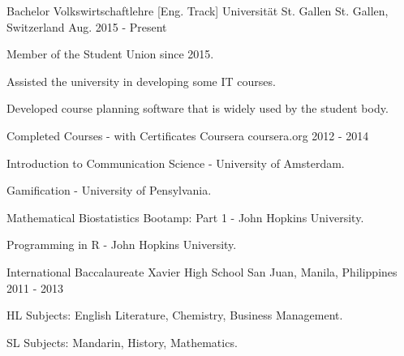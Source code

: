 \begin{cventries}

  \cventry
    {Bachelor Volkswirtschaftlehre [Eng. Track]} %
    {Universität St. Gallen} %
    {St. Gallen, Switzerland} %
    {Aug. 2015 - Present} %
    {} %
    {
      \begin{cvitems} %
        \item {Member of the Student Union since 2015.}
        \item {Assisted the university in developing some IT courses.}
        \item {Developed course planning software that is widely used by the student body.}
      \end{cvitems}
    }

  \cventry
  {Completed Courses - with Certificates} %
  {Coursera} %
  {coursera.org} %
  {2012 - 2014} %
  {} %
  {
    \begin{cvitems} %
        \item {Introduction to Communication Science - University of Amsterdam.}
        \item {Gamification - University of Pensylvania.}
        \item {Mathematical Biostatistics Bootamp: Part 1 - John Hopkins University.}
        \item {Programming in R - John Hopkins University.}
    \end{cvitems}
  }

  \cventry
    {International Baccalaureate} %
    {Xavier High School} %
    {San Juan, Manila, Philippines} %
    {2011 - 2013} %
    {} %
    {
      \begin{cvitems} %
        \item {HL Subjects: English Literature, Chemistry, Business Management.}
        \item {SL Subjects: Mandarin, History, Mathematics.}
      \end{cvitems}
    }

\end{cventries}
